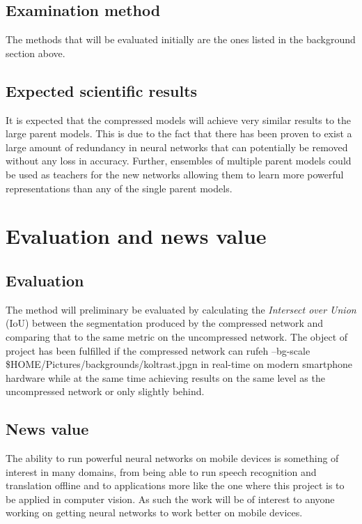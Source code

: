 \documentclass[11pt]{article}
\begin{document}
\subsection{Examination method}
\label{sec:orge44549d}
The methods that will be evaluated initially are the ones listed in the background section above. 

\subsection{Expected scientific results}
\label{sec:org1854033}
It is expected that the compressed models will achieve very similar results to the large parent models. This is due to the fact that there has been proven to exist a large amount of redundancy in neural networks that can potentially be removed without any loss in accuracy. Further, ensembles of multiple parent models could be used as teachers for the new networks allowing them to learn more powerful representations than any of the single parent models.
\section{Evaluation and news value}
\label{sec:orgcdf6fa6}
\subsection{Evaluation}
\label{sec:orgbf2fa7a}
The method will preliminary be evaluated by calculating the \emph{Intersect over Union} (IoU) between the segmentation produced by the compressed network and comparing that to the same metric on the uncompressed network. The object of project has been fulfilled if the compressed network can rufeh --bg-scale \$HOME/Pictures/backgrounds/koltrast.jpgn in real-time on modern smartphone hardware while at the same time achieving results on the same level as the uncompressed network or only slightly behind.

\subsection{News value}
\label{sec:org1e17d79}
The ability to run powerful neural networks on mobile devices is something of interest in many domains, from being able to run speech recognition and translation offline and to applications more like the one where this project is to be applied in computer vision. As such the work will be of interest to anyone working on getting neural networks to work better on mobile devices.
\end{document}
